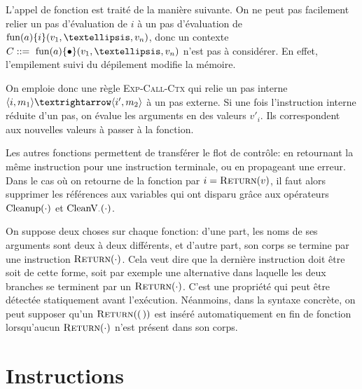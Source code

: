 


L'appel de fonction est traité de la manière suivante. On ne peut pas facilement
relier un pas d'évaluation de $i$ à un pas d'évaluation de $\eFun{a}{i}
(v_1,…,v_n)$, donc un contexte $C \gramisa \eFun{a}{\ctxEmpty} (v_1,…,v_n)$
n'est pas à considérer. En effet, l'empilement suivi du dépilement modifie la
mémoire.

On emploie donc une règle \textsc{Exp-Call-Ctx} qui relie un pas
interne $\mm{m_1}{i}{m_2}{i'}$ à un pas externe. Si une fois l'instruction
interne réduite d'un pas, on évalue les arguments en des valeurs $v'_i$. Ils
correspondent aux nouvelles valeurs à passer à la fonction.

Les autres fonctions permettent de transférer le flot de contrôle: en retournant
la même instruction pour une instruction terminale, ou en propageant une erreur.
Dans le cas où on retourne de la fonction par $i = \iReturn{v}$, il faut alors
supprimer les références aux variables qui ont disparu grâce aux opérateurs
$\phx\cCleanup$ et $\phxx\cV$.

\label{page:return-fonction}
On suppose deux choses sur chaque fonction: d'une part, les noms de ses
arguments sont deux à deux différents, et d'autre part, son corps se termine par
une instruction $\iReturn{\cdot}$. Cela veut dire que la dernière instruction
doit être soit de cette forme, soit par exemple une alternative dans laquelle
les deux branches se terminent par un $\iReturn{\cdot}$. C'est une propriété qui
peut être détectée statiquement avant l'exécution. Néanmoins, dans la syntaxe
concrète, on peut supposer qu'un $\iReturn{\eUnit}$ est inséré automatiquement
en fin de fonction lorsqu'aucun $\iReturn{\cdot}$ n'est présent dans son corps.

\begin{mathpar}


\end{mathpar}

\section{Instructions}
\label{sec:eval-instr}

